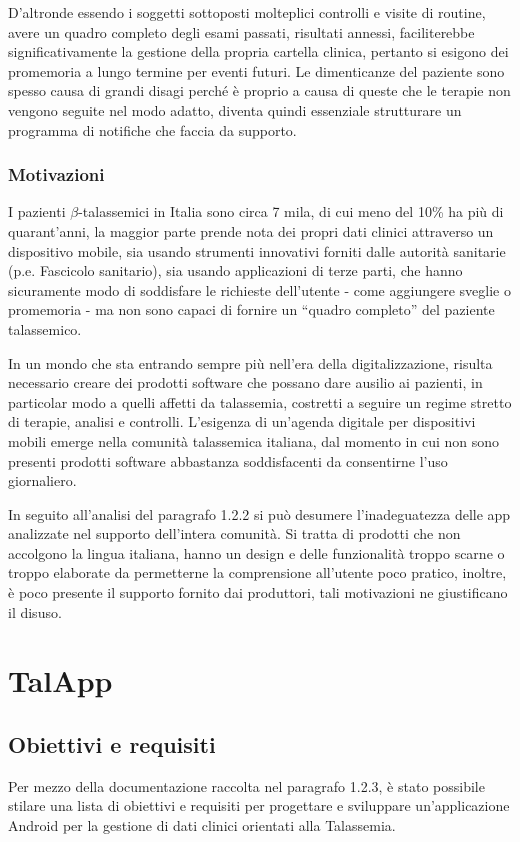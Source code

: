 \documentclass[12pt,a4paper,openright,twoside]{report}
\begin{document}
D'altronde essendo i soggetti sottoposti molteplici controlli e visite di routine, avere un quadro completo degli esami passati, risultati annessi, faciliterebbe significativamente la gestione della propria cartella clinica, pertanto si esigono dei promemoria a lungo termine per eventi futuri.
Le dimenticanze del paziente sono spesso causa di grandi disagi perché è proprio a causa di queste che le terapie non vengono seguite nel modo adatto, diventa quindi essenziale strutturare un programma di notifiche che faccia da supporto. 

\subsection{Motivazioni}
I pazienti $\beta$-talassemici in Italia sono circa 7 mila, di cui meno del 10\% ha più di quarant'anni, la maggior parte prende nota dei propri dati clinici attraverso un dispositivo mobile, sia usando strumenti innovativi forniti dalle autorità sanitarie (p.e. Fascicolo sanitario), sia usando applicazioni di terze parti, che hanno sicuramente modo di soddisfare le richieste dell'utente - come aggiungere sveglie o promemoria - ma non sono capaci di fornire un ``quadro completo'' del paziente talassemico. 

In un mondo che sta entrando sempre più nell'era della digitalizzazione, risulta necessario creare dei prodotti software che possano dare ausilio ai pazienti, in particolar modo a quelli affetti da talassemia, costretti a seguire un regime stretto di terapie, analisi e controlli. 
L'esigenza di un'agenda digitale per dispositivi mobili emerge nella comunità talassemica italiana, dal momento in cui non sono presenti prodotti software abbastanza soddisfacenti da consentirne l'uso giornaliero. 

In seguito all'analisi del paragrafo 1.2.2 si può desumere l'inadeguatezza delle app analizzate nel supporto dell'intera comunità. Si tratta di prodotti che non accolgono la lingua italiana, hanno un design e delle funzionalità troppo scarne o troppo elaborate da permetterne la comprensione all'utente poco pratico, inoltre, è poco presente il supporto fornito dai produttori, tali motivazioni ne giustificano il disuso. 


\chapter{TalApp}

\section{Obiettivi e requisiti}
Per mezzo della documentazione raccolta nel paragrafo 1.2.3, è stato possibile stilare una lista di obiettivi e requisiti per progettare e sviluppare un'applicazione Android per la gestione di dati clinici orientati alla Talassemia.
\end{document}
